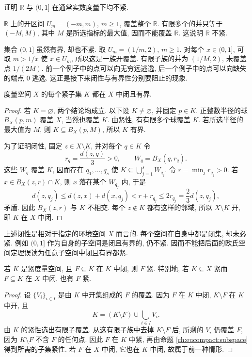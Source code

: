 \begin{example}
证明 $\mathbb{R}$ 与 $(0,1]$ 在通常实数度量下均不紧.
\end{example}
\begin{solution}
$\mathbb{R}$ 上的开区间 $U_m=(-m,m)$, $m\geq1$, 覆盖整个 $\mathbb{R}$. 有限多个的并只等于 $(-M,M)$, 其中 $M$ 是所选指标的最大值, 因而不能覆盖 $\mathbb{R}$. 这说明 $\mathbb{R}$ 不紧.

集合 $(0,1]$ 虽然有界, 却也不紧. 取 $U_m=(1/m,2)$, $m\geq1$. 对每个 $x\in(0,1]$, 可取 $m>1/x$ 使 $x\in U_m$, 所以这是一族开覆盖. 有限子族的并为 $(1/M,2)$, 未覆盖点 $1/(2M)$. 前一个例子中的点可以向无穷远逃逸, 后一个例子中的点可以向缺失的端点 $0$ 逃逸. 这正是接下来闭性与有界性分别要阻止的现象.
\end{solution}

\begin{theorem}[度量空间中的紧集闭且有界]
\label{ch:eucompact:compact-closed-bounded}
度量空间 $X$ 的每个紧子集 $K$ 都在 $X$ 中闭且有界.
\end{theorem}
\begin{proof}
若 $K=\varnothing$, 两个结论均成立. 以下设 $K\ne\varnothing$, 并固定 $p\in K$. 正整数半径的球 $B_X(p,m)$ 覆盖 $X$, 当然也覆盖 $K$. 由紧性, 有有限多个球覆盖 $K$. 若所选半径的最大值为 $M$, 则 $K\subseteq B_X(p,M)$, 所以 $K$ 有界.

为了证明闭性, 固定 $z\in X\setminus K$, 并对每个 $q\in K$ 令
\[
 r_q=\frac{d(z,q)}{3}>0,\qquad W_q=B_X(q,r_q).
\]
这些 $W_q$ 覆盖 $K$, 因而存在 $q_1,\ldots,q_s$ 使 $K\subseteq\bigcup_{j=1}^sW_{q_j}$. 令 $r=\min_jr_{q_j}>0$. 若 $x\in B_X(z,r)\cap K$, 则 $x$ 落在某个 $W_{q_j}$ 内, 于是
\[
 d(z,q_j)\leq d(z,x)+d(x,q_j)
 <r+r_{q_j}\leq2r_{q_j}=\frac23d(z,q_j),
\]
矛盾. 因此 $B_X(z,r)$ 与 $K$ 不相交. 每个 $z\notin K$ 都有这样的邻域, 所以 $X\setminus K$ 开, 即 $K$ 在 $X$ 中闭.
\end{proof}

上述闭性是相对于指定的环境空间 $X$ 而言的. 每个空间在自身中都是闭集, 却未必紧. 例如 $(0,1]$ 作为自身的子空间是闭且有界的, 仍不紧. 因而不能把后面的欧氏空间定理误读为任意子空间中闭且有界都紧.

\begin{proposition}[紧空间的闭子集]
\label{ch:eucompact:closed-subset}
若 $K$ 是紧度量空间, 且 $F\subseteq K$ 在 $K$ 中闭, 则 $F$ 紧. 特别地, 若 $K\subseteq X$ 紧而 $F\subseteq K$ 在 $X$ 中闭, 也有 $F$ 紧.
\end{proposition}
\begin{proof}
设 $\{V_i\}_{i\in I}$ 是由 $K$ 中开集组成的 $F$ 的覆盖. 因为 $F$ 在 $K$ 中闭, $K\setminus F$ 在 $K$ 中开, 且
\[
 K=(K\setminus F)\cup\bigcup_{i\in I}V_i.
\]
由 $K$ 的紧性选出有限子覆盖. 从这有限子族中去掉 $K\setminus F$ 后, 所剩的 $V_i$ 仍覆盖 $F$, 因为 $K\setminus F$ 不含 $F$ 的任何点. 因此 $F$ 在 $K$ 中紧, 再由命题 \ref{ch:eucompact:subspace} 得到所需的子集紧性. 若 $F$ 在 $X$ 中闭, 它也在 $K$ 中闭, 故属于前一种情形.
\end{proof}

